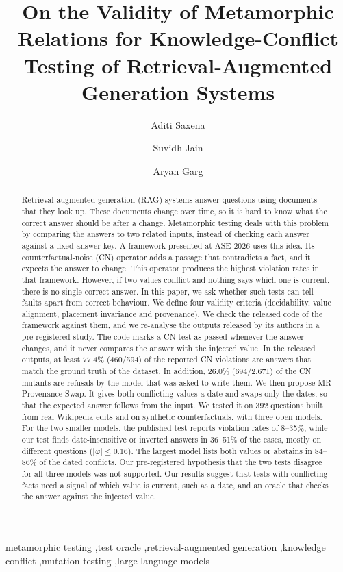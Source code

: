 \documentclass[preprint,12pt,authoryear]{elsarticle}
\newcommand{\cn}{\textsc{CN}}
\begin{document}
\begin{frontmatter}

\title{On the Validity of Metamorphic Relations for Knowledge-Conflict Testing of Retrieval-Augmented Generation Systems}

\author[1]{Aditi Saxena}
\author[1]{Suvidh Jain}
\author[1]{Aryan Garg}

\begin{abstract}
Retrieval-augmented generation (RAG) systems answer questions using documents that they look up.
These documents change over time, so it is hard to know what the correct answer should be after a
change. Metamorphic testing deals with this problem by comparing the answers to two related inputs,
instead of checking each answer against a fixed answer key. A framework presented at ASE 2026 uses
this idea. Its counterfactual-noise (\cn) operator adds a passage that contradicts a fact, and it
expects the answer to change. This operator produces the highest violation rates in that framework.
However, if two values conflict and nothing says which one is current, there is no single correct
answer. In this paper, we ask whether such tests can tell faults apart from correct behaviour. We
define four validity criteria (decidability, value alignment, placement invariance and provenance).
We check the released code of the framework against them, and we re-analyse the outputs released by
its authors in a pre-registered study. The code marks a \cn{} test as passed whenever the answer
changes, and it never compares the answer with the injected value. In the released outputs, at least
77.4\% (460/594) of the reported \cn{} violations are answers that match the ground truth of the
dataset. In addition, 26.0\% (694/2{,}671) of the \cn{} mutants are refusals by the model that was
asked to write them. We then propose MR-Provenance-Swap. It gives both conflicting values a date and
swaps only the dates, so that the expected answer follows from the input. We tested it on 392
questions built from real Wikipedia edits and on synthetic counterfactuals, with three open models.
For the two smaller models, the published test reports violation rates of 8--35\%, while our test
finds date-insensitive or inverted answers in 36--51\% of the cases, mostly on different questions
($|\varphi| \le 0.16$). The largest model lists both values or abstains in 84--86\% of the dated
conflicts. Our pre-registered hypothesis that the two tests disagree for all three models was not
supported. Our results suggest that tests with conflicting facts need a signal of which value is
current, such as a date, and an oracle that checks the answer against the injected value.
\end{abstract}

\begin{keyword}
metamorphic testing \sep test oracle \sep retrieval-augmented generation \sep knowledge conflict
\sep mutation testing \sep large language models
\end{keyword}

\end{frontmatter}
\end{document}
